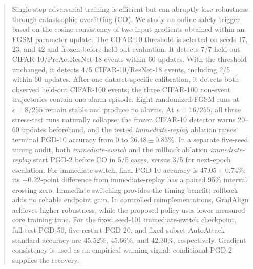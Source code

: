 \begin{abstract}
Single-step adversarial training is efficient but can abruptly lose robustness
through catastrophic overfitting (CO). We study an online safety trigger based
on the cosine consistency of two input gradients obtained within an FGSM
parameter update. The CIFAR-10 threshold is selected on seeds 17, 23, and 42
and frozen before held-out evaluation. It detects 7/7 held-out
CIFAR-10/PreActResNet-18 events within 60 updates. With the threshold unchanged,
it detects 4/5 CIFAR-10/ResNet-18 events, including 2/5 within 60 updates. After
one dataset-specific calibration, it detects both observed held-out CIFAR-100
events; the three CIFAR-100 non-event trajectories contain one alarm episode.
Eight randomized-FGSM runs at $\epsilon=8/255$ remain stable and produce no
alarms. At $\epsilon=16/255$, all three stress-test runs naturally collapse;
the frozen CIFAR-10 detector warns 20--60 updates beforehand, and the tested
\emph{immediate-replay} ablation raises terminal PGD-10 accuracy from 0 to
$26.48\pm0.83\%$. In a separate five-seed timing audit, both
\emph{immediate-switch} and the rollback ablation \emph{immediate-replay}
start PGD-2 before CO in 5/5 cases, versus 3/5 for
next-epoch escalation. For immediate-switch, final PGD-10 accuracy is
$47.05\pm0.74\%$; its $+0.22$-point difference from immediate-replay has a paired 95\%
interval crossing zero. Immediate switching provides the timing benefit; rollback
adds no reliable endpoint gain. In controlled reimplementations, GradAlign
achieves higher robustness, while the proposed policy uses lower measured core
training time. For the fixed seed-101 immediate-switch checkpoint, full-test PGD-50,
five-restart PGD-20, and fixed-subset AutoAttack-standard accuracy are 45.52\%,
45.66\%, and 42.30\%, respectively. Gradient consistency is used as an
empirical warning signal; conditional PGD-2 supplies the recovery.
\end{abstract}
